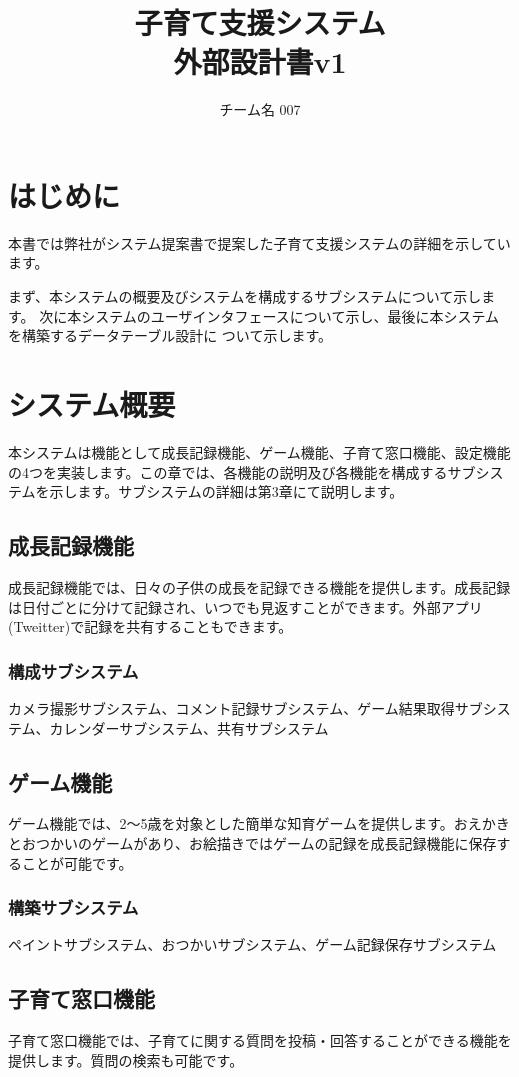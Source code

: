 \documentclass[a4j]{jarticle}
\title{
\vspace{30mm}
{\bf 子育て支援システム}
\\
\vspace{5mm}
{\bf 外部設計書v1\\
}
\vspace{120mm}
}
\author{
\vspace{5mm}
チーム名 007\\
\vspace{5mm}
}
\begin{document}
\maketitle
\tableofcontents
\newpage

\section{はじめに}
本書では弊社がシステム提案書で提案した子育て支援システムの詳細を示しています。

まず、本システムの概要及びシステムを構成するサブシステムについて示します。
次に本システムのユーザインタフェースについて示し、最後に本システムを構築するデータテーブル設計に
ついて示します。

\section{システム概要}
本システムは機能として成長記録機能、ゲーム機能、子育て窓口機能、設定機能の4つを実装します。この章では、各機能の説明及び各機能を構成するサブシステムを示します。サブシステムの詳細は第3章にて説明します。

\subsection{成長記録機能}
成長記録機能では、日々の子供の成長を記録できる機能を提供します。成長記録は日付ごとに分けて記録され、いつでも見返すことができます。外部アプリ(Tweitter)で記録を共有することもできます。
\subsubsection*{構成サブシステム}
\noindent カメラ撮影サブシステム、コメント記録サブシステム、ゲーム結果取得サブシステム、カレンダーサブシステム、共有サブシステム

\subsection{ゲーム機能}
ゲーム機能では、2〜5歳を対象とした簡単な知育ゲームを提供します。おえかきとおつかいのゲームがあり、お絵描きではゲームの記録を成長記録機能に保存することが可能です。
\subsubsection*{構築サブシステム}
\noindent ペイントサブシステム、おつかいサブシステム、ゲーム記録保存サブシステム

\subsection{子育て窓口機能}
子育て窓口機能では、子育てに関する質問を投稿・回答することができる機能を提供します。質問の検索も可能です。
\end{document}
